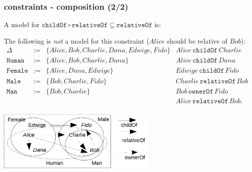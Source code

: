 \documentclass[8pt]{beamer}
\newcommand{\Human}{\mathtt{Human}}
\newcommand{\Male}{\mathtt{Male}}
\newcommand{\Female}{\mathtt{Female}}
\newcommand{\Man}{\mathtt{Man}}
\newcommand{\relative}{\mathtt{relativeOf}}
\newcommand{\child}{\mathtt{childOf}}
\newcommand{\owner}{\mathtt{ownerOf}}
\newcommand{\Alice}{Alice}
\newcommand{\Bob}{Bob}
\newcommand{\Charlie}{Charlie}
\newcommand{\Dana}{Dana}
\newcommand{\Edwige}{Edwige}
\newcommand{\Fido}{Fido}
\begin{document}
\begin{frame}
 \frametitle{\elplusplus constraints - composition (2/2)}
 A model for $\child \circ \relative \subseteq \relative$ is:

 The following is \emph{not} a model for this constraint ($\Alice$ should be relative of $\Bob$):
 \[
 \begin{array}{rcl|l}
  \Delta & := & \{ \Alice, \Bob, \Charlie, \Dana, \Edwige, \Fido \} & \Alice\,\child\,\Charlie \\
  \Human & := & \{ \Alice, \Bob, \Charlie, \Dana \} & \Alice\,\child\,\Dana\\
  \Female & := & \{ \Alice, \Dana, \Edwige \} & \Edwige\,\child\,\Fido\\
  \Male & := & \{ \Bob, \Charlie, \Fido \} & \Charlie\,\relative\,\Bob \\
  \Man & := & \{ \Bob, \Charlie \} & \Bob\,\owner\,\Fido \\
  & & & \Alice\,\relative\,\Bob . \\
 \end{array}
\]

 \begin{center}
  \includegraphics[width=300px, keepaspectratio]{images/excomp_big.png}  
 \end{center}
\end{frame}
\end{document}
